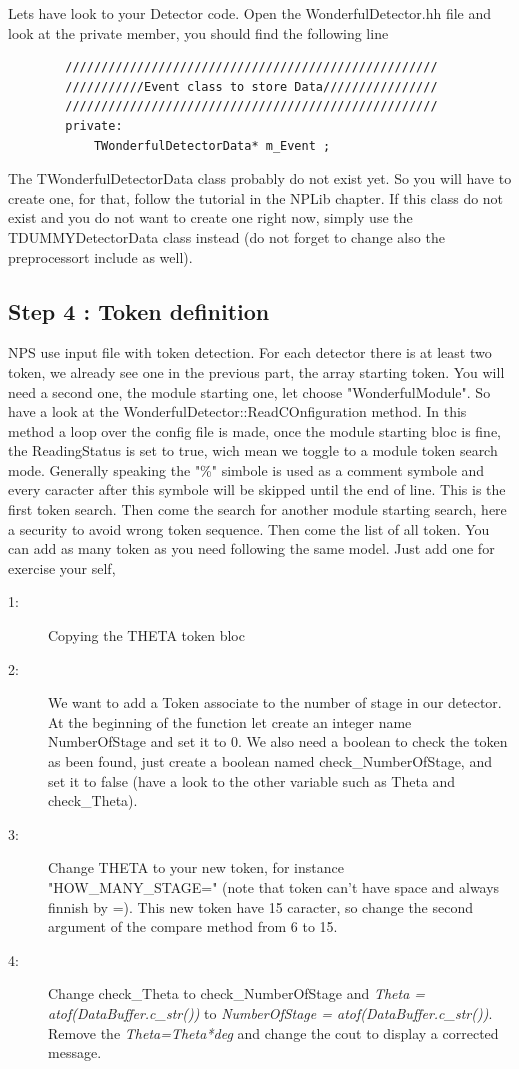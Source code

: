 \documentclass{book}
\begin{document}
	Lets have look to your Detector code. Open the WonderfulDetector.hh file and look at the private member, you should find the following line

	\begin{verbatim}
		////////////////////////////////////////////////////
		///////////Event class to store Data////////////////
		////////////////////////////////////////////////////
		private:
			TWonderfulDetectorData* m_Event ;

	\end{verbatim}

	The TWonderfulDetectorData class probably do not exist yet. 
	So you will have to create one, for that, follow the tutorial in the NPLib chapter. 
	If this class do not exist and you do not want to create one right now, simply use the TDUMMYDetectorData class instead (do not forget to change also the preprocessort include as well).

	\subsection{Step 4 : Token definition}
		NPS use input file with token detection. 
		For each detector there is at least two token, we already see one in the previous part, the array starting token. 
		You will need a second one, the module starting one, let choose "WonderfulModule". 
		So have a look at the WonderfulDetector::ReadCOnfiguration method. 
		In this method a loop over the config file is made, once the module starting bloc is fine, the ReadingStatus is set to true, wich mean we toggle to a module token search mode. 
		Generally speaking the "\%" simbole is used as a comment symbole and every caracter after this symbole will be skipped until the end of line. 
		This is the first token search. 
		Then come the search for another module starting search, here a security to avoid wrong token sequence. 
		Then come the list of all token. 
		You can add as many token as you need following the same model. 
		Just add one for exercise your self,

		\begin{description}
			\item[1:] Copying the THETA token bloc
			\item[2:] We want to add a Token associate to the number of stage in our detector. At the beginning of the function let create an integer name NumberOfStage and set it to 0. We also need a boolean to check the token as been found, just create a boolean named check\_NumberOfStage, and set it to false (have a look to the other variable such as Theta and check\_Theta).
			\item[3:] Change THETA to your new token, for instance "HOW\_MANY\_STAGE=" (note that token can't have space and always finnish by =). This new token have 15 caracter, so change the second argument of the compare method from 6 to 15.
			\item[4:] Change check\_Theta to check\_NumberOfStage and \emph{Theta = atof(DataBuffer.c\_str())} to \emph{NumberOfStage = atof(DataBuffer.c\_str())}. Remove the \emph{Theta=Theta*deg} and change the cout to display a corrected message.
		\end{description}
\end{document}
